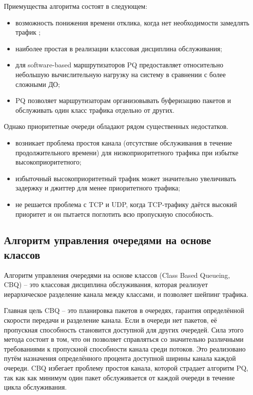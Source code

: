     Приемущества алгоритма состоят в следующем:
    \begin{itemize}
		\item возможность понижения времени отклика, когда нет необходимости замедлять трафик \cite{tcprio};
        \item наиболее простая в реализации классовая дисциплина обслуживания;
        \item для software-based маршрутизаторов PQ предоставляет относительно небольшую
             вычислительную нагрузку на систему в сравнении с более сложными ДО;
        \item PQ позволяет маршрутизаторам организовывать буферизацию пакетов и обслуживать
             один класс трафика отдельно от других. \cite{suppdiff}
    \end{itemize}

    Однако приоритетные очереди обладают рядом существенных недостатков.
    \begin{itemize}
        \item возникает проблема простоя канала (отсутствие обслуживания в течение продолжительного времени)
			  для низкоприоритетного трафика при избытке высокоприоритетного\cite{packethandling};
        \item избыточный высокоприоритетный трафик может значительно увеличивать
                задержку и джиттер для менее приоритетного трафика;
        \item не решается проблема с TCP и UDP, когда TCP-трафику даётся высокий приоритет и он
                пытается поглотить всю пропускную способность. \cite{suppdiff}
    \end{itemize}

    \subsection{Алгоритм управления очередями на основе классов}

        Алгоритм управления очередями на основе классов (Class Based Queueing, CBQ) -- это
        классовая дисциплина обслуживания, которая реализует
        иерархическое разделение канала между классами, и позволяет
        шейпинг трафика. \cite{tccbq}

        Главная цель CBQ -- это планировка пакетов в очередях, гарантия определённой
        скорости передачи и разделение канала. Если в очереди нет пакетов, её
        пропускная способность становится доступной для других очередей. Сила
        этого метода состоит в том, что он позволяет справляться со значительно
        различными требованиями к пропускной способности канала среди потоков. Это
        реализовано путём назначения определённого процента доступной ширины
        канала каждой очереди. CBQ избегает проблему простоя канала, которой страдает
        алгоритм PQ, так как как минимум один пакет обслуживается от каждой очереди
        в течение цикла обслуживания.\cite{packethandling}

